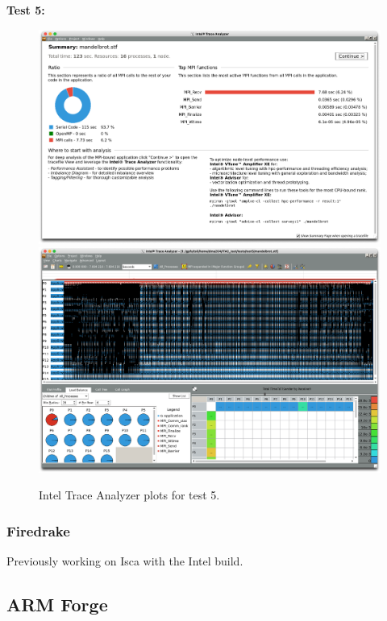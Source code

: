 \documentclass[a4paper,titlepage]{article}
\begin{document}
\noindent
\textbf{Test 5:}  
\begin{figure}[htbp]
\begin{center}
\includegraphics[scale=0.3]{figures/test5_summary}
\includegraphics[scale=0.3]{figures/test5_eventTimeline}
\caption{Intel Trace Analyzer plots for test 5.}
\label{fig:test5_ITAC_summary}
\end{center}
\end{figure}

\subsubsection{Firedrake}

Previously working on Isca with the Intel build. 


\subsection{ARM Forge}
\end{document}
